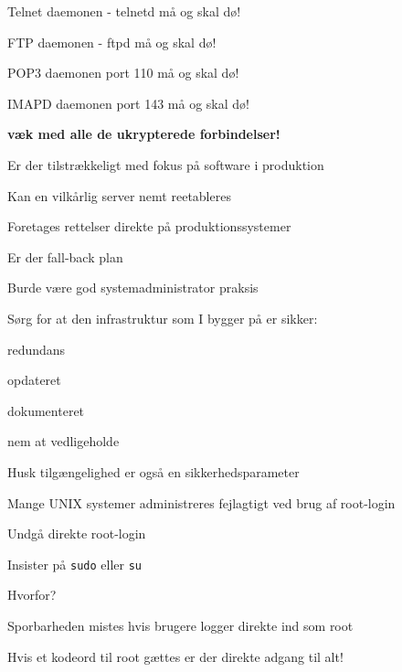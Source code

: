 \documentclass[Screen16to9,17pt]{foils}
\begin{document}
\centerline{\hlkbig Telnet daemonen - telnetd må og skal dø!}

\pause
\centerline{\hlkbig FTP daemonen - ftpd må og skal dø!}

\pause
\centerline{\hlkbig POP3 daemonen port 110 må og skal dø!}

\pause
\centerline{\hlkbig IMAPD daemonen port 143 må og skal dø!}

\pause
\vskip 1cm
\centerline{\hlkbig\bf væk med alle de ukrypterede forbindelser!}



\begin{list1}
\item Er der tilstrækkeligt med fokus på software i produktion
\item Kan en vilkårlig server nemt reetableres
\item Foretages rettelser direkte på produktionssystemer
\item Er der fall-back plan
\item Burde være god systemadministrator praksis
\end{list1}




\begin{list1}
\item Sørg for at den infrastruktur som I bygger på er sikker:
\begin{list2}
 \item redundans
       \item opdateret
        \item dokumenteret
        \item nem at vedligeholde
\end{list2}

\item  Husk tilgængelighed er også en sikkerhedsparameter
\end{list1}




\begin{list1}
\item Mange UNIX systemer administreres fejlagtigt ved brug af
  root-login
\item Undgå direkte root-login
\item Insister på \verb+sudo+ eller \verb+su+
\item Hvorfor?
\begin{list2}
\item Sporbarheden mistes hvis brugere logger direkte ind som root
\item Hvis et kodeord til root gættes er der direkte adgang til alt!
\end{list2}
\end{list1}


\slidenext
\end{document}
